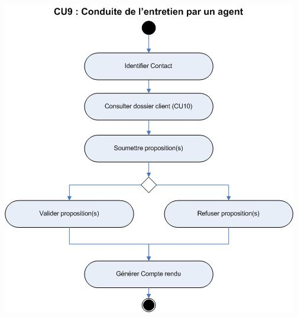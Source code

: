 \begin {center}
\includegraphics[width=\textwidth]{../../diagrammeActivite/DACU9.jpg}

\end{center}
